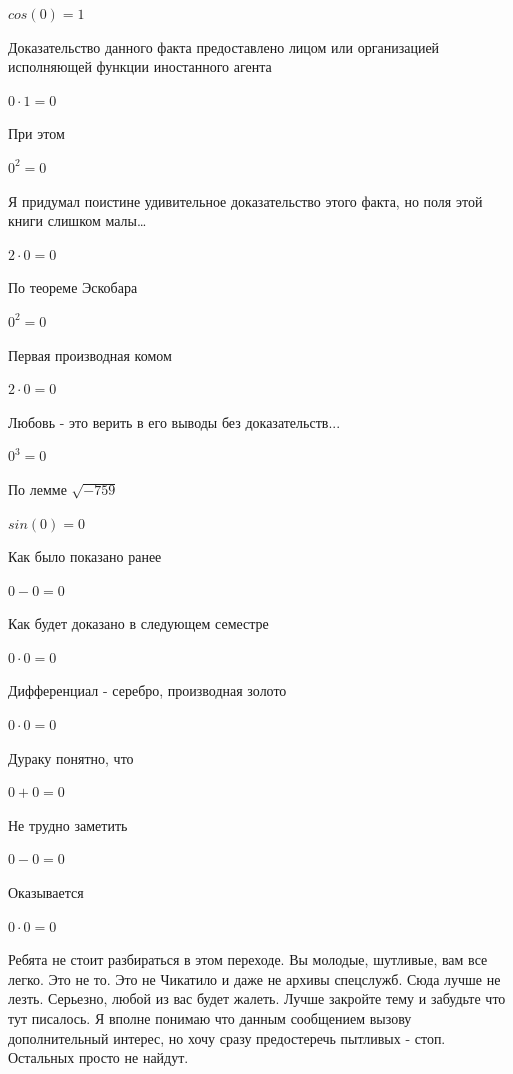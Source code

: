 \documentclass[12pt,a4paper,fleqn]{article}
\begin{document}
\begin{center}$cos(0) = 1$\end{center}
Доказательство данного факта предоставлено лицом или организацией исполняющей функции иностанного агента

\begin{center}$0 \cdot 1 = 0$\end{center}
При этом

\begin{center}$0^{2} = 0$\end{center}
Я придумал поистине удивительное доказательство этого факта, но поля этой книги слишком малы\ldots

\begin{center}$2 \cdot 0 = 0$\end{center}
По теореме Эскобара

\begin{center}$0^{2} = 0$\end{center}
Первая производная комом\cite{link2}

\begin{center}$2 \cdot 0 = 0$\end{center}
Любовь - это верить в его выводы без доказательств...

\begin{center}$0^{3} = 0$\end{center}
По лемме $\sqrt{-759}$
\begin{center}$sin(0) = 0$\end{center}
Как было показано ранее

\begin{center}$0-0 = 0$\end{center}
Как будет доказано в следующем семестре

\begin{center}$0 \cdot 0 = 0$\end{center}
Дифференциал - серебро, производная золото\cite{link2}

\begin{center}$0 \cdot 0 = 0$\end{center}
Дураку понятно, что

\begin{center}$0+0 = 0$\end{center}
Не трудно заметить

\begin{center}$0-0 = 0$\end{center}
Оказывается

\begin{center}$0 \cdot 0 = 0$\end{center}
Ребята не стоит разбираться в этом переходе. Вы молодые, шутливые, вам все легко. Это не то. Это не Чикатило и даже не архивы спецслужб. Сюда лучше не лезть. Серьезно, любой из вас будет жалеть. Лучше закройте тему и забудьте что тут писалось. Я вполне понимаю что данным сообщением вызову дополнительный интерес, но хочу сразу предостеречь пытливых - стоп. Остальных просто не найдут.
\end{document}
